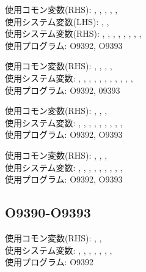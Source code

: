 \begin{hosoku}\small
使用コモン変数(RHS): , , , , , \\
使用システム変数(LHS): , , \\
使用システム変数(RHS): , , , , , , , , \\
使用プログラム: O9392, O9393
\end{hosoku}

\begin{hosoku}\small
使用コモン変数(RHS): , , , , \\
使用システム変数: , , , , , , , , , , , \\
使用プログラム: O9392, 09393
\end{hosoku}

\begin{hosoku}\small
使用コモン変数(RHS): , , , \\
使用システム変数: , , , , , , , , , \\
使用プログラム: O9392, O9393
\end{hosoku}

\begin{hosoku}\small
使用コモン変数(RHS): , , , \\
使用システム変数: , , , , , , , , , \\
使用プログラム: O9392, O9393
\end{hosoku}

\subsection{O9390-O9393}
\begin{hosoku}\small
使用コモン変数(RHS): , , \\
使用システム変数: , , , , , , , \\
使用プログラム: O9392
\end{hosoku}

